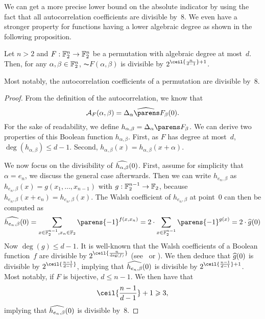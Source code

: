 We can get a more precise lower bound on the absolute indicator by using the fact that all autocorrelation coefficients are divisible by~$8$.
We even have a stronger property for functions having a lower algebraic degree as shown in the following proposition.
\begin{proposition}[Divisibility]\label{prop:act:divisible-by-eight}
    Let $n > 2$ and $F : \mathbb{F}_2^n \to \mathbb{F}_2^n$ be a permutation with algebraic degree at most~$d$.
    Then, for any $\alpha, \beta \in \mathbb{F}_2^n$,
    $\AC{F}(\alpha, \beta)$ is divisible by $2^{\ceil{\frac{n}{d-1}}+1}$.

    Most notably, the autocorrelation coefficients of a permutation are divisible by~$8$.
\end{proposition}
\begin{proof}
    From the definition of the autocorrelation, we know that
    \begin{equation*}
        \AC{F}(\alpha, \beta) = \FC{\derive{\alpha}{F_\beta}}(0).
    \end{equation*}
    For the sake of readability, we define $h_{\alpha, \beta} = \derive{\alpha}{F_\beta}$.
    We can derive two properties of this Boolean function $h_{\alpha, \beta}$.
    First, as $F$ has degree at most~$d$, $\deg(h_{\alpha, \beta}) \leqslant d-1$.
    Second, $h_{\alpha, \beta}(x) = h_{\alpha, \beta}(x+\alpha)$.

    We now focus on the divisibility of $\widehat{h_{\alpha, \beta}}(0)$.
    First, assume for simplicity that $\alpha = e_n$, we discuss the general case afterwards.
    Then we can write $h_{e_n, \beta}$ as $h_{e_n, \beta}(x) = g(x_1, \ldots, x_{n-1})$ with $g : \mathbb{F}_2^{n-1} \to \mathbb{F}_2$, because $h_{e_n, \beta}(x+e_n) = h_{e_n, \beta}(x)$.
    The Walsh coefficient of $h_{e_n, \beta}$ at point~$0$ can then be computed as
    \begin{equation*}
        \FC{h_{e_n, \beta}}(0)
        = \sum_{x \in \F_2^{n-1}, x_n \in \F_2} \parens{-1}^{f(x, x_n)}
        = 2 \cdot \sum_{x \in \F_2^{n-1}} \parens{-1}^{g(x)}
        = 2 \cdot \FC{g}(0)
    \end{equation*}
    Now $\deg(g) \leqslant d-1$.
    It is well-known that the Walsh coefficients of a Boolean function~$f$ are divisible by $2^{\ceil{\frac{n}{\deg(f)}}}$ (see~\cite{DM:McE72} or \cite[Section~3.1]{BMM:Carlet10a}).
    We then deduce that $\widehat{g}(0)$ is divisible by $2^{\ceil{\frac{n-1}{d-1}}}$, implying that $\widehat{h_{e_n, \beta}}(0)$ is divisible by $2^{\ceil{\frac{n-1}{d-1}}+1}$.
    Most notably, if $F$ is bijective, $d \leqslant n-1$.
    We then have that
    \begin{equation*}
        \ceil{\frac{n-1}{d-1}} + 1 \geqslant 3,
    \end{equation*}
    implying that $\widehat{h_{e_n, \beta}}(0)$ is divisible by~$8$.


\end{proof}
